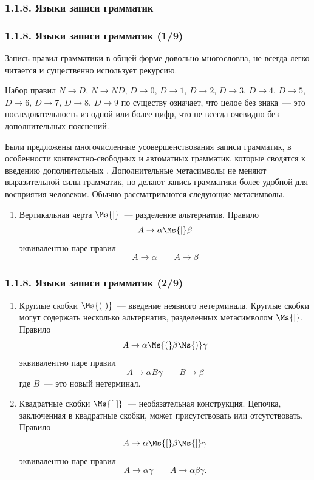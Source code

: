 \subsubsection{1.1.8. Языки записи грамматик}\label{1.1.8.}
\begin{frame}
\frametitle{1.1.8. Языки записи грамматик (1/9)}
Запись правил грамматики в общей форме довольно многословна, не всегда легко читается и
существенно использует рекурсию. 

\begin{example}
Набор правил
$N\to D$, $N\to ND$, $D\to 0$,
$D\to 1$, $D\to 2$, $D\to 3$, 
$D\to 4$, $D\to 5$, 
$D\to 6$, $D\to 7$, $D\to 8$, $D\to 9$
по существу означает, что целое без знака~--- это
последовательность из одной или более цифр, что не всегда очевидно
без дополнительных пояснений.
\end{example}

\smallskip
Были предложены многочисленные усовершенствования записи грамматик, в особенности контекстно-свободных и 
автоматных грамматик,
которые сводятся к введению дополнительных
. Дополнительные метасимволы не
меняют выразительной силы  грамматик, но делают запись грамматики более
удобной для восприятия человеком. Обычно рассматриваются следующие
метасимволы.

\begin{enumerate}
\item Вертикальная черта $\Ms{|}$~--- разделение альтернатив. Правило
$$
A\rightarrow \alpha \Ms{|}\beta
$$
эквивалентно паре правил
$$
A\rightarrow \alpha  \qquad A\rightarrow\beta
$$
\end{enumerate}
\end{frame}

\begin{frame}
\frametitle{1.1.8. Языки записи грамматик (2/9)}
\begin{enumerate}

\item[2.] Круглые скобки $\Ms{(\ )}$~--- введение неявного нетерминала.
Круглые скобки могут содержать несколько альтернатив, разделенных
метасимволом $\Ms{|}$. Правило
$$
A\rightarrow \alpha\Ms{(}\beta\Ms{)}\gamma
$$
эквивалентно паре правил
$$
A\rightarrow \alpha B\gamma \qquad B\rightarrow\beta
$$
где $B$~--- это новый нетерминал.
\item[3.] Квадратные скобки $\Ms{[\ ]}$~--- необязательная конструкция.
Цепочка, заключенная в квадратные скобки, может присутствовать или
отсутствовать. Правило
$$
A\rightarrow \alpha\Ms{[}\beta\Ms{]}\gamma
$$
эквивалентно паре правил
$$
A\rightarrow \alpha\gamma \qquad A\rightarrow\alpha\beta\gamma.
$$
\end{enumerate}
\end{frame}

